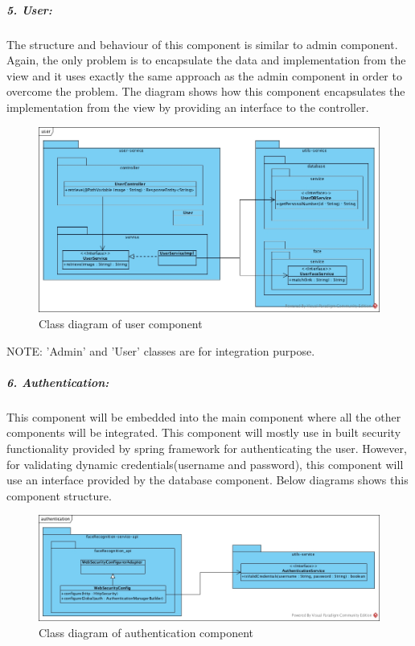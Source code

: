 \documentclass[a4paper,11pt]{article}
\begin{document}
\subparagraph{5. User: }The structure and behaviour of this component is similar to admin component. Again, the only problem is to encapsulate the data and implementation from the view and it uses exactly the same approach as the admin component in order to overcome the problem. The diagram shows how this component encapsulates the implementation from the view by providing an interface to the controller.

\begin{figure}[ht!]
    \centering
	\includegraphics[width=130mm]{ClassDiagrams/new/user.jpg}
	\caption{Class diagram of user component}
\end{figure}

NOTE: 'Admin' and 'User' classes are  for integration purpose.


\newpage
\subparagraph{6. Authentication: } This component will be embedded into the main component where all the other components will be integrated. This component will mostly use in built security functionality provided by spring framework for authenticating the user. However, for validating dynamic credentials(username and password), this component will use an interface provided by the database component. Below diagrams shows this component structure.

\begin{figure}[ht!]
    \centering
	\includegraphics[width=130mm]{ClassDiagrams/new/authentication.jpg}
	\caption{Class diagram of authentication component}
\end{figure}
\end{document}
